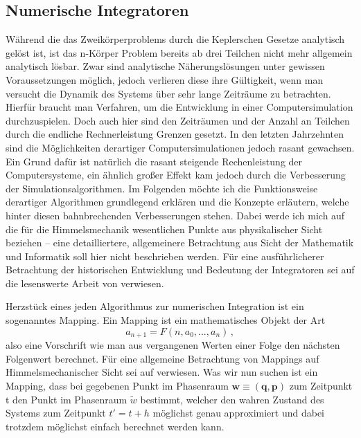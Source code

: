 \documentclass[12pt,a4paper,twoside]{article}
\renewcommand{\cite}{\citep}
\renewcommand{\vec}{\mathbf}
\begin{document}
\subsection{Numerische Integratoren}
Während die das Zweikörperproblems durch die Keplerschen Gesetze analytisch gelöst ist, ist das n-Körper Problem bereits ab drei Teilchen nicht mehr allgemein analytisch lösbar.
Zwar sind analytische Näherungslösungen unter gewissen Voraussetzungen möglich, jedoch verlieren diese ihre Gültigkeit, wenn man versucht die Dynamik des Systems über sehr lange Zeiträume zu betrachten. Hierfür braucht man Verfahren, um die Entwicklung in einer Computersimulation durchzuspielen. %
Doch auch hier sind den Zeiträumen und der Anzahl an Teilchen durch die endliche Rechnerleistung Grenzen gesetzt. %
In den letzten Jahrzehnten sind die Möglichkeiten derartiger Computersimulationen jedoch rasant gewachsen. Ein Grund dafür ist natürlich die rasant steigende Rechenleistung der Computersysteme, ein ähnlich großer Effekt kam jedoch durch die Verbesserung der Simulationsalgorithmen\cite{Morbidelli2002}. Im Folgenden möchte ich die Funktionsweise derartiger Algorithmen grundlegend erklären und die Konzepte erläutern, welche hinter diesen bahnbrechenden Verbesserungen stehen. Dabei werde ich mich auf die für die Himmelsmechanik wesentlichen Punkte aus physikalischer Sicht beziehen -- eine detailliertere, allgemeinere Betrachtung aus Sicht der Mathematik und Informatik soll hier nicht beschrieben werden.
Für eine ausführlicherer Betrachtung der historischen Entwicklung und Bedeutung der Integratoren sei auf die lesenswerte Arbeit von \cite{Morbidelli2002} verwiesen.

Herzstück eines jeden Algorithmus zur numerischen Integration ist ein sogenanntes Mapping. Ein Mapping ist ein mathematisches Objekt der Art
\begin{equation}
a_{n+1} = F(n,a_0,...,a_n) \,,
\end{equation}
also eine Vorschrift wie man aus vergangenen Werten einer Folge den nächsten Folgenwert berechnet. Für eine allgemeine Betrachtung von Mappings auf Himmelsmechanischer Sicht sei auf \cite{Dvorak2005} verwiesen.
Was wir nun suchen ist ein Mapping, dass bei gegebenen Punkt im Phasenraum $\vec{w}\equiv(\vec{q},\vec{p})$ zum Zeitpunkt t den Punkt im Phasenraum $\tilde{w}$ bestimmt, welcher den wahren Zustand des Systems zum Zeitpunkt $t'=t+h$ möglichst genau approximiert und dabei trotzdem möglichst einfach berechnet werden kann\cite{Binney2008}.
\end{document}
